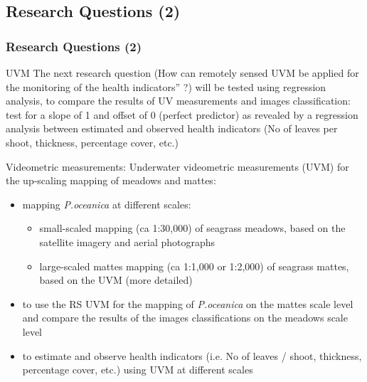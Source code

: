 \documentclass[pdflatex,compress,8pt,
	xcolor={dvipsnames,dvipsnames,svgnames,x11names,table},
	hyperref={colorlinks = true,breaklinks = true, urlcolor = NavyBlue, breaklinks = true}]{beamer}
\begin{document}
\subsection{Research Questions (2)}
\begin{frame}\frametitle{Research Questions (2)}

\begin{alertblock}{UVM}
The next research question (How can remotely sensed UVM be applied for the monitoring of the health indicators” ?) will be tested using regression analysis, to compare the results of UV measurements and images classification: test for a slope of 1 and offset of 0 (perfect predictor) as revealed by a regression analysis between estimated and observed health indicators (No of leaves per shoot, thickness, percentage cover, etc.)
\end{alertblock}

\begin{block}{Videometric measurements:}
Underwater videometric measurements (UVM) for the up-scaling mapping of meadows and mattes:
\begin{itemize}
	\item mapping \emph{P.oceanica} at different scales:
	\begin{itemize}
		\item small-scaled mapping (ca 1:30,000) of seagrass meadows, based on the satellite imagery and aerial photographs
		\item large-scaled mattes mapping (ca 1:1,000 or 1:2,000) of seagrass mattes, based on the UVM (more detailed)
	\end{itemize}
	\item to use the RS UVM for the mapping of \emph{P.oceanica} on the mattes scale level and compare the results of the images classifications on the meadows scale level
	\item to estimate and observe health indicators (i.e. No of leaves / shoot, thickness, percentage cover, etc.) using UVM at different scales
\end{itemize}
\end{block}

\end{frame}
\end{document}
